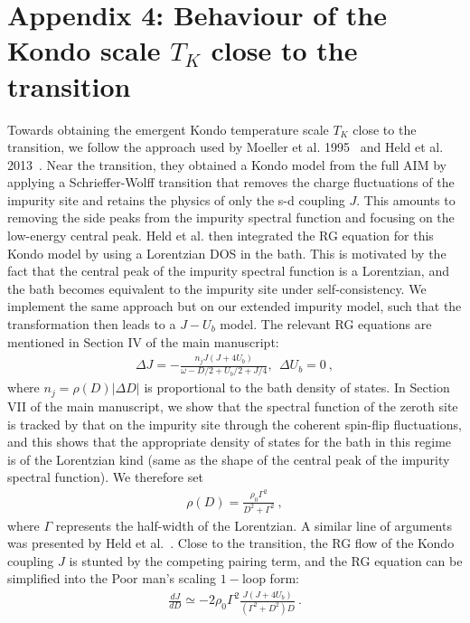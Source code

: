\section*{Appendix 4: Behaviour of the Kondo scale $T_K$ close to the transition}
\label{app-Tk}
Towards obtaining the emergent Kondo temperature scale $T_K$ close to the transition, we follow the approach used by Moeller et al. 1995~\cite{moeller_1995} and Held et al. 2013~\cite{held_2013}. Near the transition, they obtained a Kondo model from the full AIM by applying a Schrieffer-Wolff transition that removes the charge fluctuations of the impurity site and retains the physics of only the s-d coupling \(J\). This amounts to removing the side peaks from the impurity spectral function and focusing on the low-energy central peak. Held et al. then integrated the RG equation for this Kondo model by using a Lorentzian DOS in the bath. This is motivated by the fact that the central peak of the impurity spectral function is a Lorentzian, and the bath becomes equivalent to the impurity site under self-consistency. We implement the same approach but on our extended impurity model, such that the transformation then leads to a \(J-U_b\) model. The relevant RG equations are mentioned in Section IV of the main manuscript:
\begin{eqnarray}
	\Delta J = -\frac{n_j J\left(J + 4U_b\right)}{\omega - D/2 + U_b/2 + J/4},~~ \Delta U_b = 0~,
\end{eqnarray}
where \(n_j = \rho(D)|\Delta D|\) is proportional to the bath density of states. In Section VII of the main manuscript, we show that the spectral function of the zeroth site is tracked by that on the impurity site through the coherent spin-flip fluctuations, and this shows that the appropriate density of states for the bath in this regime is of the Lorentzian kind (same as the shape of the central peak of the impurity spectral function). We therefore set
\begin{eqnarray}
	\rho(D) = \frac{\rho_0 \Gamma^2}{D^2 + \Gamma^2}~,
\end{eqnarray}
where \(\Gamma\) represents the half-width of the Lorentzian. A similar line of arguments was presented by Held et al.~\cite{held_2013}. Close to the transition, the RG flow of the Kondo coupling \(J\) is stunted by the competing pairing term, and the RG equation can be simplified into the Poor man's scaling \(1-\)loop form:
\begin{eqnarray}
	\frac{d J}{d D} \simeq -2\rho_0 \Gamma^2\frac{J\left(J + 4U_b\right)}{\left( \Gamma^2 + D^2 \right) D}~.
\end{eqnarray}
